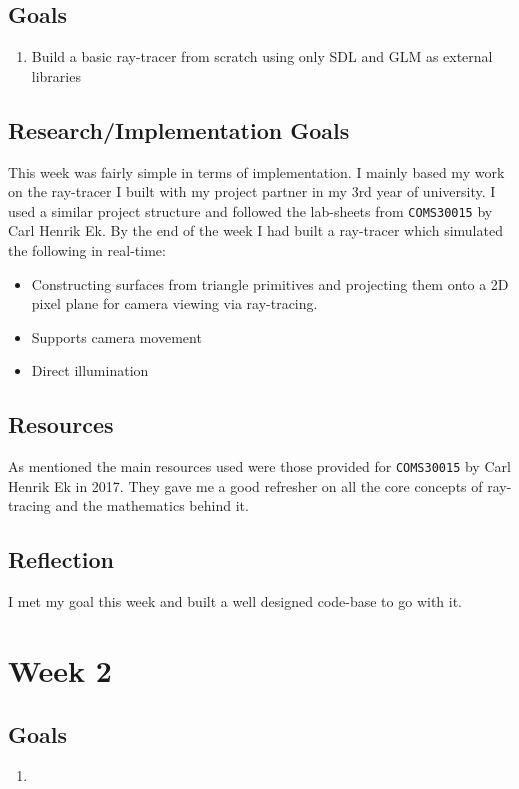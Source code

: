 \documentclass[conference]{IEEEtran}
\begin{document}
\subsection{Goals}
\begin{enumerate}
\item Build a basic ray-tracer from scratch using only SDL and GLM as external libraries
\end{enumerate}

\subsection{Research/Implementation Goals}
This week was fairly simple in terms of implementation. I mainly based my work on the ray-tracer I built with my project partner in my 3rd year of university. I used a similar project structure and followed the lab-sheets from  \verb|COMS30015| by Carl Henrik Ek. By the end of the week I had built a ray-tracer which simulated the following in real-time:

\begin{itemize}
\item Constructing surfaces from triangle primitives and projecting them onto a 2D pixel plane for camera viewing via ray-tracing.
\item Supports camera movement
\item Direct illumination 
\end{itemize}

\subsection{Resources}
As mentioned the main resources used were those provided for \verb|COMS30015| by Carl Henrik Ek in 2017. They gave me a good refresher on all the core concepts of ray-tracing and the mathematics behind it.

\subsection{Reflection}
I met my goal this week and built a well designed code-base to go with it.

\section*{Week 2}

\subsection{Goals}
\begin{enumerate}
\item
\end{enumerate}
\end{document}

